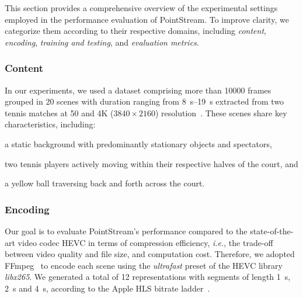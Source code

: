 \documentclass[manuscript, screen]{acmart}
\newcommand{\ie}{\emph{i.e.}, }
\newcommand{\vxv}[2]{$#1\!\times\!#2$}
\begin{document}
This section provides a comprehensive overview of the experimental settings employed in the performance evaluation of PointStream. 
To improve clarity, we categorize them according to their respective domains, including \textit{content}, \textit{encoding}, \textit{training and testing}, and \textit{evaluation metrics}.

\subsubsection*{Content}\label{subsubsec:content}

In our experiments, we used a dataset comprising more than \num{10000} frames grouped in \num{20} scenes with duration ranging from \qtyrange{8}{19}{\second} extracted from two tennis matches at \qty{50}{\fps} and 4K (\vxv{3840}{2160}) resolution~\cite{tennistv}.
These scenes share key characteristics, including:
\begin{enumerate*}[label=\textit{(\roman*)}]
\item a static background with predominantly stationary objects and spectators,
\item two tennis players actively moving within their respective halves of the court, and
\item a yellow ball traversing back and forth across the court.
\end{enumerate*}

\subsubsection*{Encoding}
Our goal is to evaluate PointStream's performance compared to the state-of-the-art video codec HEVC in terms of compression efficiency, \ie the trade-off between video quality and file size, and computation cost. 
Therefore, we adopted FFmpeg~\cite{ffmpeg} to encode each scene using the \textit{ultrafast} preset of the HEVC library \textit{libx265}. 
We generated a total of \num{12} representations with segments of length \qty{1}{\second}, \qty{2}{\second} and \qty{4}{\second}, according to the Apple HLS bitrate ladder~\cite{AppleHLS}. %
\end{document}
